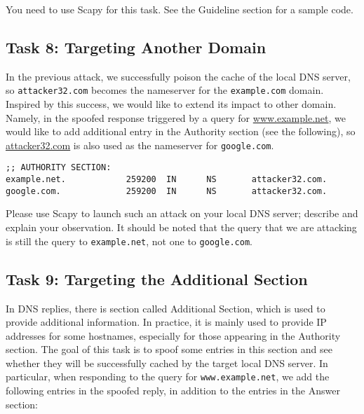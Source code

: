 You need to use Scapy for this task. See the Guideline section for 
a sample code. 


\subsection{Task 8: Targeting Another Domain} 

In the previous attack, we successfully poison the cache of the local DNS
server, so \texttt{attacker32.com} becomes the nameserver for the 
\texttt{example.com} domain. Inspired by this success, we would like to 
extend its impact to other domain. Namely, 
in the spoofed response triggered by a query for
\url{www.example.net}, we would like to add additional entry
in the Authority section (see the following), so
\url{attacker32.com} is also used as the nameserver for 
\texttt{google.com}.  


\begin{lstlisting}
;; AUTHORITY SECTION:
example.net.            259200  IN      NS       attacker32.com.
google.com.             259200  IN      NS       attacker32.com.
\end{lstlisting}

Please use Scapy to launch such an attack on your local DNS server;
describe  and explain your observation. It should be noted that the query
that we are attacking is still the query to \texttt{example.net}, not one
to \texttt{google.com}.  



\subsection{Task 9: Targeting the Additional Section}

In DNS replies, there is section called Additional Section, which is used
to provide additional information. In practice, it is mainly used to
provide IP addresses for some hostnames, especially for those appearing in the
Authority section. The goal of this task is to spoof some entries 
in this section and see whether they will be successfully cached by the
target local DNS server. In particular, when responding to 
the query for \texttt{www.example.net}, we add the following entries 
in the spoofed reply, in addition to the entries in the Answer section:


